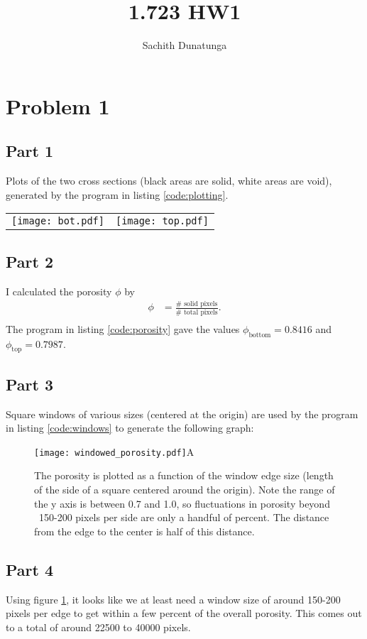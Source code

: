 \documentclass{article}
\title{1.723 HW1}
\author{Sachith  Dunatunga}
\begin{document}
\maketitle

%
%
%
\section{Problem 1}
\subsection{Part 1}
Plots of the two cross sections (black areas are solid, white areas are void), generated by the program in listing \ref{code:plotting}.

\begin{tabular}{c c}
\texttt{[image: bot.pdf]} & \texttt{[image: top.pdf]} \\
\end{tabular}

\subsection{Part 2}
I calculated the porosity $\phi$ by 
\begin{align}
    \phi &= \frac{\#\text{ solid pixels}}{\#\text{ total pixels}}. \\
\end{align}
The program in listing \ref{code:porosity} gave the values $\phi_{\mathrm{bottom}} = 0.8416$ and $\phi_{\mathrm{top}} = 0.7987$.

\subsection{Part 3}
Square windows of various sizes (centered at the origin) are used by the program in listing \ref{code:windows} to generate the following graph:
\begin{figure}[!h]
\centering
\texttt{[image: windowed\_porosity.pdf]}A
\caption{The porosity is plotted as a function of the window edge size (length of the side of a square centered around the origin). Note the range of the y axis is between 0.7 and 1.0, so fluctuations in porosity beyond ~150-200 pixels per side are only a handful of percent. The distance from the edge to the center is half of this distance.}
\label{fig:windows}
\end{figure}

\subsection{Part 4}
Using figure \ref{fig:windows}, it looks like we at least need a window size of around 150-200 pixels per edge to get within a few percent of the overall porosity. This comes out to a total of around 22500 to 40000 pixels.
%
%
%
\end{document}
